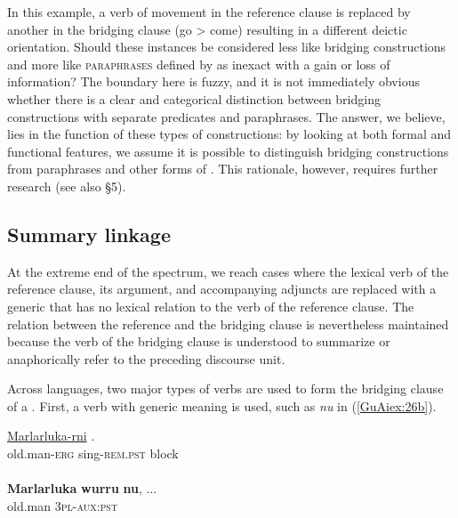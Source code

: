 \documentclass[output=paper]{LSP/langsci}
\begin{document}
In this example, a verb of movement in the reference clause is replaced by another in the bridging clause (go > come) resulting in a different deictic orientation. Should these instances be considered less like bridging constructions and more like \textsc{paraphrases} defined by \citet[][382--383]{longacre07} as inexact  with a gain or loss of information? The boundary here is fuzzy, and it is not immediately obvious whether there is a clear and categorical distinction between bridging constructions with separate predicates and paraphrases. The answer, we believe, lies in the function of these types of constructions: by looking at both formal and functional features, we assume it is possible to distinguish bridging constructions from paraphrases and other forms of . This rationale, however, requires further research (see also §5).

\subsection{Summary linkage}
\label{GuAi32summ.link}
At the extreme end of the  spectrum, we reach cases where the lexical verb of the reference clause, its argument, and accompanying adjuncts are replaced with a generic  that has no lexical relation to the verb of the reference clause. The relation between the reference and the bridging clause is nevertheless maintained because the verb of the bridging clause is understood to summarize or anaphorically refer to the preceding discourse unit.

Across languages, two major types of verbs are used to form the bridging clause of a . First, a verb with generic meaning is used, such as \textit{nu} in (\ref{GuAiex:26b}).

\begin{exe}
\ex \label{GuAiex:26ab}
 {\citealt{Pensalfini}}
\begin{xlist}
\ex \label{GuAiex:26a}
\gll \underline{Marlarluka-rni}    \underline{}  \underline{}. \\
old.man-\textsc{erg}     sing-\textsc{rem.pst}    block\\
\glt {} \\
\ex \label{GuAiex:26b}
\gll  \textbf{Marlarluka}   \textbf{wurru} \textbf{nu}, ...\\
 old.man   \textsc{3pl}-\textsc{aux:pst}\\
\glt {} 
\end{xlist}
\end{exe}
\end{document}

